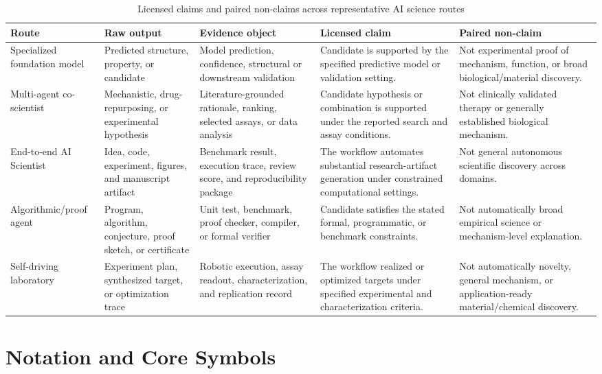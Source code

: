 \documentclass[11pt,a4paper]{article}
\begin{document}
\begin{table}[H]
\centering
\scriptsize
\caption{Licensed claims and paired non-claims across representative AI science routes}
\label{tab:paired-nonclaims}
\begin{tabularx}{\textwidth}{@{}>{\raggedright\arraybackslash}p{2.35cm}>{\raggedright\arraybackslash}p{2.55cm}>{\raggedright\arraybackslash}p{2.55cm}Y Y@{}}
\toprule
Route & Raw output & Evidence object & Licensed claim & Paired non-claim \\
\midrule
Specialized foundation model & Predicted structure, property, or candidate & Model prediction, confidence, structural or downstream validation & Candidate is supported by the specified predictive model or validation setting. & Not experimental proof of mechanism, function, or broad biological/material discovery. \\
Multi-agent co-scientist & Mechanistic, drug-repurposing, or experimental hypothesis & Literature-grounded rationale, ranking, selected assays, or data analysis & Candidate hypothesis or combination is supported under the reported search and assay conditions. & Not clinically validated therapy or generally established biological mechanism. \\
End-to-end AI Scientist & Idea, code, experiment, figures, and manuscript artifact & Benchmark result, execution trace, review score, and reproducibility package & The workflow automates substantial research-artifact generation under constrained computational settings. & Not general autonomous scientific discovery across domains. \\
Algorithmic/proof agent & Program, algorithm, conjecture, proof sketch, or certificate & Unit test, benchmark, proof checker, compiler, or formal verifier & Candidate satisfies the stated formal, programmatic, or benchmark constraints. & Not automatically broad empirical science or mechanism-level explanation. \\
Self-driving laboratory & Experiment plan, synthesized target, or optimization trace & Robotic execution, assay readout, characterization, and replication record & The workflow realized or optimized targets under specified experimental and characterization criteria. & Not automatically novelty, general mechanism, or application-ready material/chemical discovery. \\
\bottomrule
\end{tabularx}
\end{table}

\section{Notation and Core Symbols}
\end{document}
